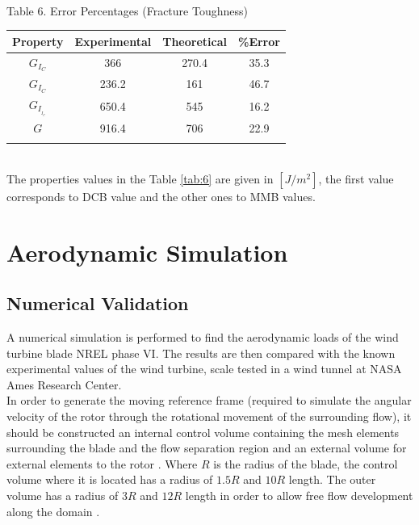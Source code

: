  \\
\vspace{0.5cm}
\begin{table,array}%
\caption{Table 6. Error Percentages (Fracture Toughness) \cite{zu} }  %
\label{tab:6}       %
\begin{center}
\begin{tabular}{cccc}
\hline\noalign{\smallskip}
Property & Experimental & Theoretical & {\%}Error \\
\hline\noalign{\smallskip}\hline\noalign{\smallskip}
$G_I_C$  & 366 & 270.4 & 35.3  \\
$G_I_C$  & 236.2 & 161 & 46.7 \\
$G_I__I_C$  & 650.4 & 545 & 16.2\\
$G$  & 916.4 & 706 & 22.9\\
\noalign{\smallskip}\hline
\end{tabular}%
\end{center}%
\end{table,array}
\\
The properties values in the Table \ref{tab:6} are given in $[J/m^2]$, the first value corresponds to DCB value and the other ones to MMB values.
\section{Aerodynamic Simulation}
\label{sec:4}
\subsection{Numerical Validation}

A numerical simulation is performed to find the aerodynamic loads of the wind turbine blade NREL phase VI. The results are then compared with the known experimental values of the wind turbine, scale tested in a wind tunnel at NASA Ames Research Center.\\

 In order to generate the moving reference frame (required to simulate the angular velocity of the rotor through the rotational movement of the surrounding flow), it should be constructed  an internal control volume containing the mesh elements surrounding the blade and the flow separation region and an external volume for external elements to the rotor \cite{lawson}. Where $R$ is the radius of the blade, the control volume where it is located has a radius of $1.5R$ and $10R$ length. The outer volume has a radius of $3R$ and $12R$ length in order to allow free flow development along the domain \cite{ijera}.\\

